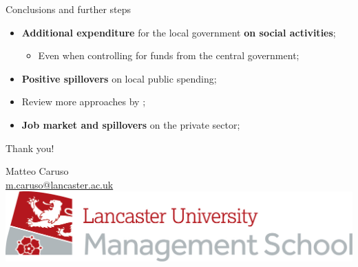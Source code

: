 \documentclass[xcolor={dvipsnames}]{beamer}
\begin{document}
\begin{frame}{Conclusions and further steps}
\justifying
\begin{itemize}
\item \textbf{Additional expenditure} for the local government \textbf{on social activities};
\begin{itemize}
    \item Even when controlling for funds from the central government;
\end{itemize}
\item \textbf{Positive spillovers} on local public spending;

\item Review more approaches by \cite{callaway2021};
\item \textbf{Job market and spillovers} on the private sector;
\end{itemize}

\end{frame}


\begin{frame}
\begin{center}
\Large Thank you! \\
\vspace{10}

\normalsize
Matteo Caruso \\
\vspace{5}
\hyperlink{m.caruso@lancaster.ac.uk}{m.caruso@lancaster.ac.uk} \\
\vspace{10}
\includegraphics[scale = 0.4]{images/logo lums.jpg}
\end{center}
\end{frame}
\end{document}

